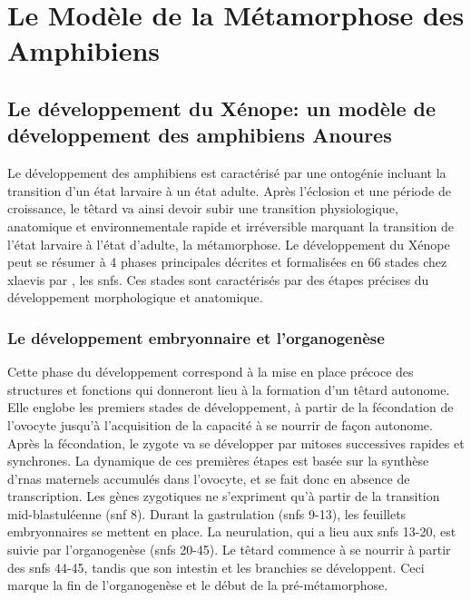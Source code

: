 \documentclass[../main.tex]{subfiles}
\begin{document}
\chapter{Le Modèle de la Métamorphose des Amphibiens}\label{chap:metamorphosis}




\section{Le développement du Xénope: un modèle de développement des amphibiens Anoures}

	Le développement des amphibiens est caractérisé par une ontogénie incluant la transition d'un état larvaire à un état adulte.
	Après l'éclosion et une période de croissance, le têtard va ainsi devoir subir une transition physiologique, anatomique et environnementale rapide et irréversible marquant la transition de l'état larvaire à l'état d'adulte, la métamorphose.
	Le développement du Xénope peut se résumer à 4 phases principales décrites et formalisées en 66 stades chez \gls{xlaevis} par \citet{Nieukoop1956}, les \glspl{snf}.
	Ces stades sont caractérisés par des étapes précises du développement morphologique et anatomique.

	\subsection{Le développement embryonnaire et l'organogenèse}
		Cette phase du développement correspond à la mise en place précoce des structures et fonctions qui donneront lieu à la formation d'un têtard autonome.
		Elle englobe les premiers stades de développement, à partir de la fécondation de l'ovocyte jusqu'à l'acquisition de la capacité à se nourrir de façon autonome.
		Après la fécondation, le zygote va se développer par mitoses successives rapides et synchrones.
		La dynamique de ces premières étapes est basée sur la synthèse d'\glspl{rna} maternels accumulés dans l'ovocyte, et se fait donc en absence de transcription.
		Les gènes zygotiques ne s'expriment qu'à partir de la transition mid-blastuléenne (\gls{snf} 8).
		Durant la gastrulation (\glspl{snf} 9-13), les feuillets embryonnaires se mettent en place.
		La neurulation, qui a lieu aux \glspl{snf} 13-20, est suivie par l'organogenèse (\glspl{snf} 20-45).
		Le têtard commence à se nourrir à partir des \glspl{snf} 44-45, tandis que son intestin et les branchies se développent.
		Ceci marque la fin de l'organogenèse et le début de la pré-métamorphose.
\end{document}
